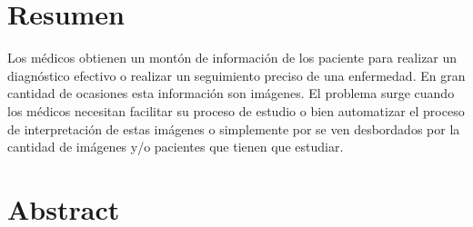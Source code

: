 \section*{Resumen}
Los médicos obtienen un montón de información de los paciente para realizar
un diagnóstico efectivo o realizar un seguimiento preciso de una
enfermedad. En gran cantidad de ocasiones esta información son
imágenes. El problema surge cuando los médicos necesitan facilitar su
proceso de estudio o bien automatizar el proceso de
interpretación de estas imágenes o simplemente por se ven desbordados
por la cantidad de imágenes y/o pacientes que tienen que estudiar.  
\section*{Abstract}

